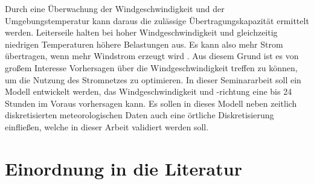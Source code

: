 \documentclass[
12pt, %
toc=listofnumbered, %
toc=chapterentrydotfill, %
numbers=noenddot, %
captions=tableheading, %
bibliography=numbered
]{scrreprt}
\let\Oldsection\section
\renewcommand{\section}{\FloatBarrier\Oldsection}
\begin{document}
Durch eine Überwachung der Windgeschwindigkeit und der Umgebungstemperatur kann daraus die zulässige Übertragungskapazität ermittelt werden. 
Leiterseile halten bei hoher Windgeschwindigkeit und gleichzeitig niedrigen Temperaturen höhere Belastungen aus. 
Es kann also mehr Strom übertragen, wenn mehr Windstrom erzeugt wird \cite{2015_Axthelm_BisFaktenZur}. Aus diesem Grund ist es von großem Interesse Vorhersagen über die Windgeschwindigkeit treffen zu können, um 
die Nutzung des Stromnetzes zu optimieren. In dieser Seminararbeit soll ein Modell entwickelt werden, das 
Windgeschwindigkeit und -richtung eine bis 24 Stunden im Voraus vorhersagen kann. Es sollen in dieses Modell neben zeitlich diskretisierten 
meteorologischen Daten auch eine örtliche Diskretisierung einfließen, welche in dieser Arbeit validiert werden soll.

\section{Einordnung in die Literatur}\label{section:literatur}
\end{document}
